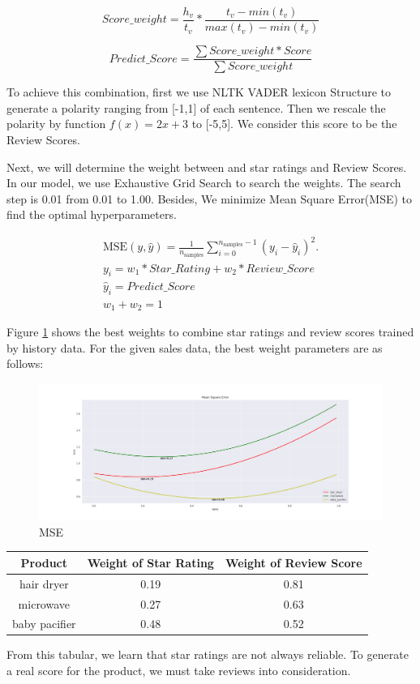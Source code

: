 \documentclass[12pt]{article}  %
\begin{document}
\begin{equation}\label{eq:1}
Score\_weight = \frac{h_v}{t_v} * \frac{t_v-min(t_v)}{max(t_v)-min(t_v)}
\end{equation}

\begin{equation}\label{eq:2}
Predict\_Score = \frac{\sum{Score\_weight * Score}}{\sum{Score\_weight} }
\end{equation}

To achieve this combination, first we use NLTK VADER lexicon Structure to generate a polarity ranging from [-1,1] of each sentence. Then we rescale the polarity by function $f(x)=2x+3$ to [-5,5]. We consider this score to be the Review Scores. 

Next, we will determine the weight between and star ratings and Review Scores. In our model, we use Exhaustive Grid Search to search the weights. The search step is 0.01 from 0.01 to 1.00. Besides, We minimize Mean Square Error(MSE) to find the optimal hyperparameters.\cite{5}

\begin{gather}
\text{MSE}(y, \hat{y}) = \frac{1}{n_\text{samples}} \sum_{i=0}^{n_\text{samples} - 1} (y_i - \hat{y}_i)^2.\\
y_i = w_1 * Star\_Rating + w_2 * Review\_Score\\
\hat{y}_i = Predict\_Score\\
w_1+w_2=1
\end{gather}

Figure \ref{fig:MSE} shows the best weights to combine star ratings and review scores trained by history data. For the given sales data, the best weight parameters are as follows:

\begin{figure}[!htbp]
\centering
\includegraphics[width=.9\textwidth]{alpha_loss.png}
\caption{MSE}\label{fig:MSE}
\end{figure}

\begin{center}
\begin{tabular}{|c|c|c|}
\hline 
Product & Weight of Star Rating & Weight of Review Score\\
\hline  
hair dryer & 0.19 & 0.81\\
\hline
microwave & 0.27 & 0.63\\
\hline
baby pacifier & 0.48 & 0.52\\
\hline
\end{tabular}
\end{center}
From this tabular, we learn that star ratings are not always reliable. To generate a real score for the product, we must take reviews into consideration. 
\end{document}
